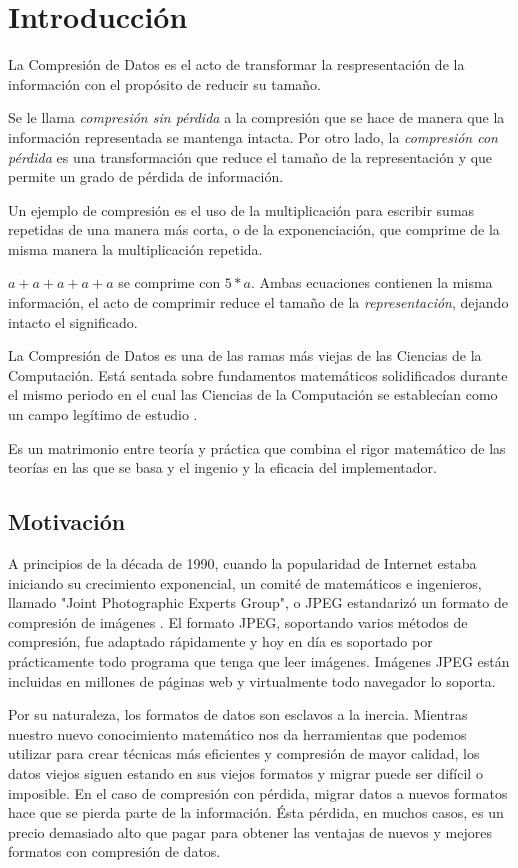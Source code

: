 \chapter{Introducción}\label{ch:introduction}

La \gls{Compresión de Datos} es el acto de transformar la respresentación de la
información con el propósito de reducir su tamaño.

Se le llama \emph{compresión sin pérdida} a la compresión que se hace de manera
que la información representada se mantenga intacta. Por otro lado, la
\emph{compresión con pérdida} es una transformación que reduce el tamaño de la
representación y que permite un grado de pérdida de información.

Un ejemplo de compresión es el uso de la multiplicación para escribir sumas
repetidas de una manera más corta, o de la exponenciación, que comprime de la
misma manera la multiplicación repetida.

$ a + a + a + a + a $ se comprime con $ 5 * a $. Ambas ecuaciones contienen la
misma información, el acto de comprimir reduce el tamaño de la
\emph{representación}, dejando intacto el significado.

La Compresión de Datos es una de las ramas más viejas de las Ciencias de la
Computación. Está sentada sobre fundamentos matemáticos solidificados durante
el mismo periodo en el cual las Ciencias de la Computación se establecían como
un campo legítimo de estudio \cite{cs_the_discipline}.

Es un matrimonio entre teoría y práctica que combina el rigor matemático de las
teorías en las que se basa y el ingenio y la eficacia del implementador.

\section{Motivación}

A principios de la década de 1990, cuando la popularidad de Internet estaba
iniciando su crecimiento exponencial, un comité de matemáticos e ingenieros,
llamado "Joint Photographic Experts Group", o \gls{JPEG} estandarizó un formato de
compresión de imágenes \cite{jpeg-spec}. El formato JPEG, soportando varios
métodos de compresión, fue adaptado rápidamente y hoy en día es soportado por
prácticamente todo programa que tenga que leer imágenes. Imágenes JPEG están
incluidas en millones de páginas web y virtualmente todo navegador lo soporta.

Por su naturaleza, los formatos de datos son esclavos a la inercia. Mientras
nuestro nuevo conocimiento matemático nos da herramientas que podemos utilizar
para crear técnicas más eficientes y compresión de mayor calidad, los datos
viejos siguen estando en sus viejos formatos y migrar puede ser difícil o
imposible. En el caso de compresión con pérdida, migrar datos a nuevos formatos
hace que se pierda parte de la información. Ésta pérdida, en muchos casos, es
un precio demasiado alto que pagar para obtener las ventajas de nuevos y
mejores formatos con compresión de datos.

